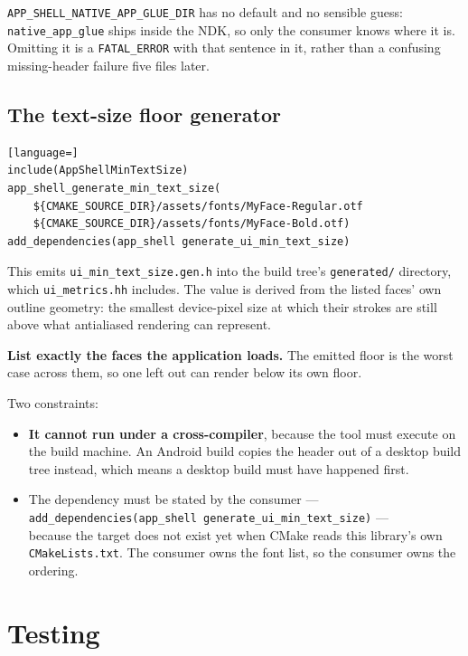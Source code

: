 \documentclass[11pt,a4paper]{article}
\begin{document}
\texttt{APP\_SHELL\_NATIVE\_APP\_GLUE\_DIR} has no default and no sensible
guess: \texttt{native\_app\_glue} ships inside the NDK, so only the consumer
knows where it is. Omitting it is a \texttt{FATAL\_ERROR} with that sentence in
it, rather than a confusing missing-header failure five files later.

\subsection{The text-size floor generator}
\label{sec:mintext}

\begin{lstlisting}[language=]
include(AppShellMinTextSize)
app_shell_generate_min_text_size(
    ${CMAKE_SOURCE_DIR}/assets/fonts/MyFace-Regular.otf
    ${CMAKE_SOURCE_DIR}/assets/fonts/MyFace-Bold.otf)
add_dependencies(app_shell generate_ui_min_text_size)
\end{lstlisting}

This emits \texttt{ui\_min\_text\_size.gen.h} into the build tree's
\texttt{generated/} directory, which \texttt{ui\_metrics.hh}
includes. The value is derived from the listed
faces' own outline geometry: the smallest device-pixel size at which their
strokes are still above what antialiased rendering can represent.

\textbf{List exactly the faces the application loads.} The emitted floor is the
worst case across them, so one left out can render below its own floor.

Two constraints:

\begin{itemize}[leftmargin=*]
\item \textbf{It cannot run under a cross-compiler}, because the tool must
  execute on the build machine. An Android build copies the header out of a
  desktop build tree instead, which means a desktop build must have happened
  first.
\item The dependency must be stated by the consumer --- \\
  \texttt{add\_dependencies(app\_shell generate\_ui\_min\_text\_size)} --- \\
  because the target does not exist yet when CMake reads this library's own
  \texttt{CMakeLists.txt}. The consumer owns the font list, so the consumer owns
  the ordering.
\end{itemize}

\section{Testing}
\end{document}
